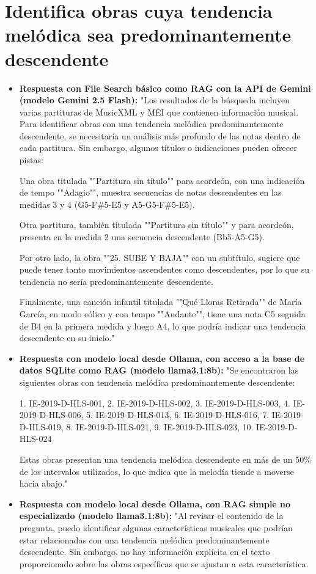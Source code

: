 \section{Identifica obras cuya tendencia melódica sea predominantemente descendente}
\begin{itemize}
    \item \textbf{Respuesta con File Search básico como RAG con la API de Gemini (modelo Gemini 2.5 Flash):} "Los resultados de la búsqueda incluyen varias partituras de MusicXML y MEI que contienen información musical. Para identificar obras con una tendencia melódica predominantemente descendente, se necesitaría un análisis más profundo de las notas dentro de cada partitura. Sin embargo, algunos títulos o indicaciones pueden ofrecer pistas:

Una obra titulada ""Partitura sin título"" para acordeón, con una indicación de tempo ""Adagio"", muestra secuencias de notas descendentes en las medidas 3 y 4 (G5-F\#5-E5 y A5-G5-F\#5-E5).

Otra partitura, también titulada ""Partitura sin título"" y para acordeón, presenta en la medida 2 una secuencia descendente (Bb5-A5-G5).

Por otro lado, la obra ""25. SUBE Y BAJA"" con un subtítulo, sugiere que puede tener tanto movimientos ascendentes como descendentes, por lo que su tendencia no sería predominantemente descendente.

Finalmente, una canción infantil titulada ""Qué Lloras Retirada"" de María García, en modo eólico y con tempo ""Andante"", tiene una nota C5 seguida de B4 en la primera medida y luego A4, lo que podría indicar una tendencia descendente en su inicio."
    \item \textbf{Respuesta con modelo local desde Ollama, con acceso a la base de datos SQLite como RAG (modelo llama3.1:8b):} "Se encontraron las siguientes obras con tendencia melódica predominantemente descendente:

1. IE-2019-D-HLS-001,
2. IE-2019-D-HLS-002,
3. IE-2019-D-HLS-003,
4. IE-2019-D-HLS-006,
5. IE-2019-D-HLS-013,
6. IE-2019-D-HLS-016,
7. IE-2019-D-HLS-019,
8. IE-2019-D-HLS-021,
9. IE-2019-D-HLS-023,
10. IE-2019-D-HLS-024

Estas obras presentan una tendencia melódica descendente en más de un 50\% de los intervalos utilizados, lo que indica que la melodía tiende a moverse hacia abajo."
\item \textbf{Respuesta con modelo local desde Ollama, con RAG simple no especializado (modelo llama3.1:8b):} "Al revisar el contenido de la pregunta, puedo identificar algunas características musicales que podrían estar relacionadas con una tendencia melódica predominantemente descendente. Sin embargo, no hay información explícita en el texto proporcionado sobre las obras específicas que se ajustan a esta característica.


\end{itemize}
